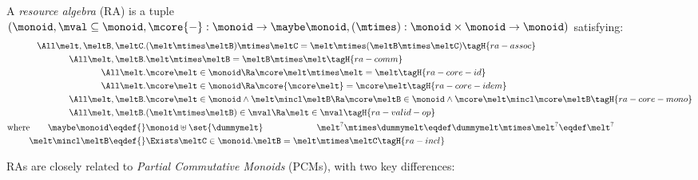 \begin{defn}
  A \emph{resource algebra} (RA) is a tuple \\
  $(\monoid, \mval \subseteq \monoid, \mcore{{-}}:
  \monoid \to \maybe\monoid, (\mtimes) : \monoid \times \monoid \to \monoid)$ satisfying:
  \begin{align*}
    \All \melt, \meltB, \meltC.& (\melt \mtimes \meltB) \mtimes \meltC = \melt \mtimes (\meltB \mtimes \meltC) \tagH{ra-assoc} \\
    \All \melt, \meltB.& \melt \mtimes \meltB = \meltB \mtimes \melt \tagH{ra-comm} \\
    \All \melt.& \mcore\melt \in \monoid \Ra \mcore\melt \mtimes \melt = \melt \tagH{ra-core-id} \\
    \All \melt.& \mcore\melt \in \monoid \Ra \mcore{\mcore\melt} = \mcore\melt \tagH{ra-core-idem} \\
    \All \melt, \meltB.& \mcore\melt \in \monoid \land \melt \mincl \meltB \Ra \mcore\meltB \in \monoid \land \mcore\melt \mincl \mcore\meltB \tagH{ra-core-mono} \\
    \All \melt, \meltB.& (\melt \mtimes \meltB) \in \mval \Ra \melt \in \mval \tagH{ra-valid-op} \\
    \text{where}\qquad %
    \maybe\monoid \eqdef{}& \monoid \uplus \set{\dummymelt} \qquad\qquad\qquad \melt^? \mtimes \dummymelt \eqdef \dummymelt \mtimes \melt^? \eqdef \melt^? \\
    \melt \mincl \meltB \eqdef{}& \Exists \meltC \in \monoid. \meltB = \melt \mtimes \meltC \tagH{ra-incl}
  \end{align*}
\end{defn}
\noindent
RAs are closely related to \emph{Partial Commutative Monoids} (PCMs), with two key differences:
